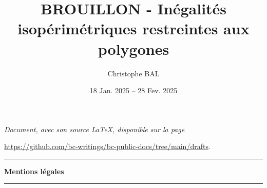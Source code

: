 \documentclass[12pt]{amsart}
\begin{document}
\title{BROUILLON - Inégalités isopérimétriques restreintes aux polygones}
\author{Christophe BAL}
\date{18 Jan. 2025 -- 28 Fev. 2025}

\maketitle

\begin{center}
	\itshape
	Document, avec son source \LaTeX, disponible sur la page

	\url{https://github.com/bc-writings/bc-public-docs/tree/main/drafts}.
\end{center}


\bigskip


\begin{center}
	\hrule\vspace{.3em}
	{
		\fontsize{1.35em}{1em}\selectfont
		\textbf{Mentions \og légales \fg}
	}

	\vspace{0.45em}
	\doclicenseThis
	\hrule
\end{center}



\setcounter{tocdepth}{2}
\tableofcontents




\newpage
\end{document}
